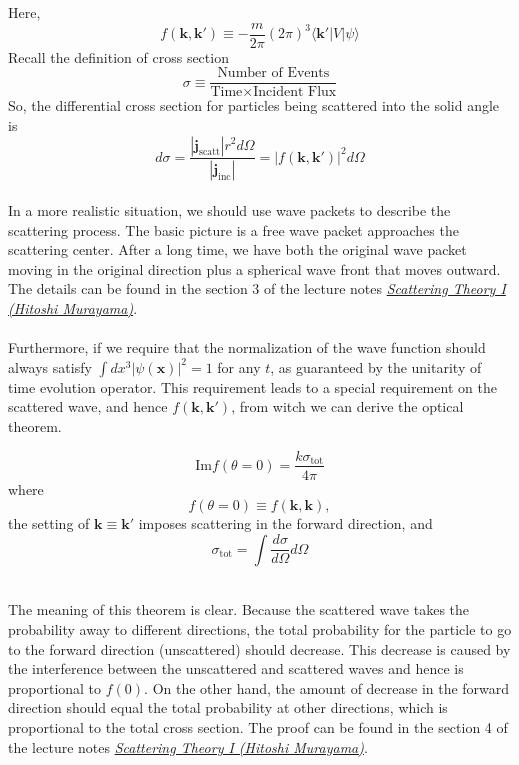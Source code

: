 \documentclass[cyan]{elegantnote}
\begin{document}
Here,
\[f(\bm{k},\bm{k}') \equiv - \frac{m}{2\pi} (2\pi)^3  \langle \bm{k}'| V | \psi\rangle \]
Recall the definition of cross section
\[\sigma \equiv \frac{\mbox{Number of Events}}{\mbox{Time} \times \mbox{Incident Flux}}\]
So, the differential cross section for particles being scattered into the solid angle is
\[d\sigma = \frac{|\bm{j}_{\mathrm{scatt}}| r^2 d\Omega}{|\bm{j}_{\mathrm{inc}}|} = |f(\bm{k},\bm{k}')|^2 d\Omega\]
\\
In a more realistic situation, we should use wave packets to describe the scattering process. The basic picture is a free wave packet approaches the scattering center. After a long time, we have both the original wave packet moving in the original direction plus a spherical wave front that moves outward. The details can be found in the section 3 of the lecture notes 
\href{http://hitoshi.berkeley.edu/221B/index.html}{\emph{Scattering Theory I (Hitoshi Murayama)}}.
\\ \\
Furthermore, if we require that the normalization of the wave function should always satisfy $\int dx^3 |\psi(\bm{x})|^2 = 1$ for any $t$, as guaranteed by the unitarity of time evolution operator. This requirement leads to a special requirement on the scattered wave, and hence $f(\bm{k},\bm{k}')$, from witch we can derive the optical theorem.\\

\begin{newthem}
\[\mathrm{Im} f(\theta = 0) = \frac{k\sigma_{\mathrm{tot}}}{4\pi}\]
where
\[f(\theta = 0) \equiv f(\bm{k},\bm{k}),\]
the setting of $\bm{k} \equiv \bm{k}'$ imposes scattering in the forward direction, and
\[\sigma_{\mathrm{tot}} = \int \frac{d\sigma}{d\Omega} d\Omega\]
\end{newthem}
\noindent
\\
The meaning of this theorem is clear. Because the scattered wave takes the probability away to different directions, the total probability for the particle to go to the forward direction (unscattered) should decrease. This decrease is caused by the interference between the unscattered and scattered waves and hence is proportional to $f(0)$. On the other hand, the amount of decrease in the forward direction should equal the total probability at other directions, which is proportional to the total cross section. The proof can be found in the section 4 of the lecture notes \href{http://hitoshi.berkeley.edu/221B/index.html}{\emph{Scattering Theory I (Hitoshi Murayama)}}.
\end{document}
